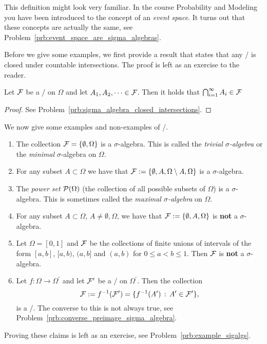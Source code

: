 This definition might look very familiar. In the course Probability and Modeling you have been introduced to the concept of an \emph{event space}. It turns out that these concepts are actually the same, see Problem~\ref{prb:event_space_are_sigma_algebras}.

Before we give some examples, we first provide a result that states that any \sigalg/ is closed under countable intersections. The proof is left as an exercise to the reader.

\begin{lemma}\label{lem:sigma_algebra_closed_intersections}
Let $\mathcal F$ be a \sigalg/ on $\Omega$ and let $A_1, A_2, \dots \in \mathcal F$. Then it holds that $\bigcap_{i = 1}^\infty A_i \in \mathcal F$
\end{lemma}
\begin{proof}
See Problem~\ref{prb:sigma_algebra_closed_intersections}.
\end{proof}

We now give some examples and non-examples of \sigalgs/.

\begin{example}\label{example:sigma_algebras}
\hfil
\begin{enumerate}[label=(\alph*)]
\item The collection $\mathcal F = \{\emptyset, \Omega\}$ is a $\sigma$-algebra. This is called the \emph{trivial $\sigma$-algebra} or the \emph{minimal} $\sigma$-algebra on $\Omega$.
\item For any subset $A \subset \Omega$ we have that $\mathcal F := \{\emptyset, A, \Omega\setminus A, \Omega\}$ is a $\sigma$-algebra.
\item The \emph{power set} $\mathcal P(\Omega)$ (the collection of all possible subsets of $\Omega$) is a $\sigma$-algebra. This is sometimes called the \emph{maximal $\sigma$-algebra} on $\Omega$.
\item For any subset $A \subset \Omega$, $A \ne \emptyset, \Omega$, we have that $\mathcal F := \{\emptyset, A, \Omega\}$ is \textbf{not} a $\sigma$-algebra.
\item Let $\Omega = [0,1]$ and $\mathcal F$ be the collections of finite unions of intervals of the form $[a,b]$, $[a,b)$, $(a,b]$ and $(a,b)$ for $0 \le a < b \le 1$. Then $\mathcal F$ is \textbf{not} a $\sigma$-algebra.
\item Let $f : \Omega \to \Omega^\prime$ and let $\mathcal F^\prime$ be a \sigalg/ on $\Omega^\prime$. Then the collection
\[
	\mathcal F := f^{-1}(\mathcal F^\prime) = \{f^{-1}(A^\prime) \, : \, A^\prime \in \mathcal F^\prime\},
\]
is a \sigalg/. The converse to this is not always true, see Problem~\ref{prb:converse_preimage_sigma_algebra}.
\end{enumerate}
Proving these claims is left as an exercise, see Problem~\ref{prb:example_sigalgs}.
\end{example}

